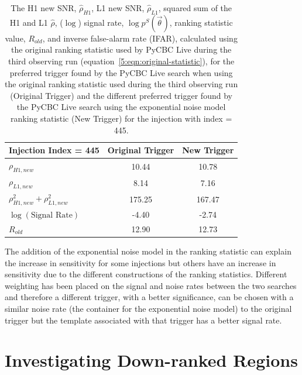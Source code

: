 \begin{table}[ht]
    \centering
    \begin{tabular}{lcc}
        \toprule
        \textbf{Injection Index = 445} & \textbf{Original Trigger} & \textbf{New Trigger} \\
        \midrule
        $\rho_{H1,new}$  & 10.44 & 10.78 \\
        $\rho_{L1,new}$   & 8.14 & 7.16 \\
        $\rho_{H1,new}^2 + \rho_{L1,new}^2$   & 175.25 & 167.47 \\
        $\log\left(\text{Signal Rate}\right)$ & -4.40 & -2.74 \\
        $R_{old}$ & 12.90 & 12.73 \\
        \bottomrule
    \end{tabular}
    \caption{The H1 new SNR, $\hat{\rho}_{H1}$, L1 new SNR, $\hat{\rho}_{L1}$, squared sum of the H1 and L1 $\hat{\rho}$, ($\log$) signal rate, $\log p^{S}(\Vec{\theta})$, ranking statistic value, $R_{old}$, and inverse false-alarm rate (IFAR), calculated using the original ranking statistic used by PyCBC Live during the third observing run (equation~\ref{5:eqn:original-statistic}), for the preferred trigger found by the PyCBC Live search when using the original ranking statistic used during the third observing run (Original Trigger) and the different preferred trigger found by the PyCBC Live search using the exponential noise model ranking statistic (New Trigger) for the injection with index = 445.}
    \label{5:tab:445-old-stat}
\end{table}
%

The addition of the exponential noise model in the ranking statistic can explain the increase in sensitivity for some injections but others have an increase in sensitivity due to the different constructions of the ranking statistics. Different weighting has been placed on the signal and noise rates between the two searches and therefore a different trigger, with a better significance, can be chosen with a similar noise rate (the container for the exponential noise model) to the original trigger but the template associated with that trigger has a better signal rate.

\section{\label{5:sec:investigating-regions}Investigating Down-ranked Regions}


